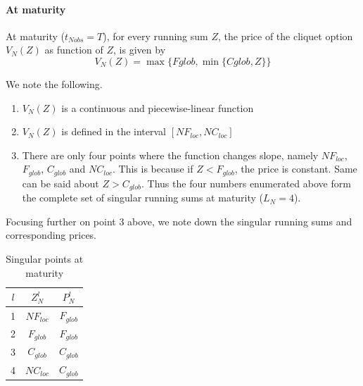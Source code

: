 \paragraph{At maturity}
At maturity ($ t_{N{obs}} = T $), for every running sum $Z$, the price of the cliquet option $ V_{N}(Z) $ as function of $Z$, is given by
\begin{equation}
	\label{eq:clq-vnobs-maturity}
	V_{N}(Z) = \max \{ Fglob, \min\{ Cglob, Z \} \}
\end{equation}

We note the following.
\begin{enumerate}
	\item $ V_{N}(Z) $ is a continuous and piecewise-linear function 
	\item $ V_{N}(Z) $ is defined in the interval $ [ N F_{loc}, N C_{loc} ] $
	\item There are only four points where the function changes slope, namely $ N F_{loc} $, $ F_{glob} $, $ C_{glob} $ and $ N C_{loc} $. This is because if $ Z < F_{glob} $, the price is constant. Same can be said about $ Z > C_{glob} $. Thus the four numbers enumerated above form the complete set of singular running sums at maturity ($ L_N = 4 $).
\end{enumerate}

Focusing further on point 3 above, we note down the singular running sums and corresponding prices.
\begin{table}[h]
	\centering
	\caption{Singular points at maturity}
	\label{tab:clq-maturity}
	\begin{tabular}{ccc}
		\toprule
		$l$  &  $ Z_{N}^l $  &  $ P_{N}^l $ \\
		\midrule
		1  &  $ N F_{loc} $  &  $ F_{glob} $ \\
		2  &  $ F_{glob} $  &  $ F_{glob} $ \\
		3  &  $ C_{glob} $  &  $ C_{glob} $ \\
		4  &  $ N C_{loc} $  &  $ C_{glob} $ \\
		\bottomrule
	\end{tabular}
\end{table}


